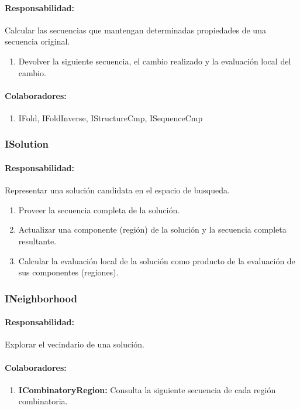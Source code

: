     \paragraph{Responsabilidad:} Calcular las secuencias que mantengan
determinadas propiedades de una secuencia original.    
      \begin{enumerate}
       \item Devolver la siguiente secuencia, el cambio realizado y la
evaluaci\'on local del cambio.       
      \end{enumerate}
    \paragraph{Colaboradores:}
      \begin{enumerate}
       \item IFold, IFoldInverse, IStructureCmp, ISequenceCmp
      \end{enumerate}

  \subsubsection{ISolution}
    \paragraph{Responsabilidad:} Representar una soluci\'on candidata en el
espacio de busqueda.
      \begin{enumerate}
       \item Proveer la secuencia completa de la soluci\'on.
       \item Actualizar una componente (regi\'on) de la soluci\'on y la
secuencia completa resultante.
       \item Calcular la evaluaci\'on local de la soluci\'on como producto de
la evaluaci\'on de sus componentes (regiones).
      \end{enumerate}         

  \subsubsection{INeighborhood}
    \paragraph{Responsabilidad:} Explorar el vecindario de una soluci\'on.      
    \paragraph{Colaboradores:}
      \begin{enumerate}
       \item \textbf{ICombinatoryRegion:} Consulta la siguiente secuencia de
cada regi\'on combinatoria.
      \end{enumerate}


